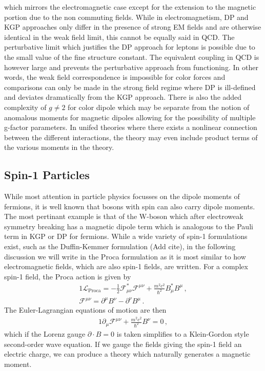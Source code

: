 which mirrors the electromagnetic case except for the extension to the magnetic portion due to the non commuting fields. While in electromagnetism, DP and KGP approaches only differ in the presence of strong EM fields and are otherwise identical in the weak field limit, this cannot be equally said in QCD. The perturbative limit which justifies the DP approach for leptons is possible due to the small value of the fine structure constant. The equivalent coupling in QCD is however large and prevents the perturbative approach from functioning. In other words, the weak field correspondence is impossible for color forces and comparisons can only be made in the strong field regime where DP is ill-defined and deviates dramatically from the KGP approach. There is also the added complexity of $g\neq2$ for color dipole which may be separate from the notion of anomalous moments for magnetic dipoles allowing for the possibility of multiple g-factor parameters. In unifed theories where there exists a nonlinear connection between the different interactions, the theory may even include product terms of the various moments in the theory.

\subsection{Spin-1 Particles}\label{ajss:proca}
While most attention in particle physics focusses on the dipole moments of fermions, it is well known that bosons with spin can also carry dipole moments. The most pertinant example is that of the W-boson which after electroweak symmetry breaking has a magnetic dipole term which is analogous to the Pauli term in KGP or DP for fermions. While a wide variety of spin-1 formulations exist, such as the Duffin-Kemmer formulation {\color{red}(Add cite)}, in the following discussion we will write in the Proca formulation as it is most similar to how electromagnetic fields, which are also spin-1 fields, are written. For a complex spin-1 field, the Proca action is given by
\begin{alignat}{1}
	\label{eq:proca:01a} \mathcal{L}_{\mathrm{Proca}} = -\frac{1}{2}\mathcal{F}_{\mu\nu}^{*}\mathcal{F}^{\mu\nu}+\frac{m^{2}c^{2}}{\hbar^{2}}B_{\mu}^{*}B^{\mu}\,,\\
	\label{eq:proca:01b} \mathcal{F}^{\mu\nu}=\partial^{\mu}B^{\nu}-\partial^{\nu}B^{\mu}\,.
\end{alignat}
The Euler-Lagrangian equations of motion are then
\begin{alignat}{1}
	\label{eq:proca:02a} \partial_{\mu}\mathcal{F}^{\mu\nu}+\frac{m^{2}c^{2}}{\hbar^{2}}B^{\nu}=0\,,
\end{alignat}
which if the Lorenz gauge $\partial\cdot B=0$ is taken simplifies to a Klein-Gordon style second-order wave equation. If we gauge the fields giving the spin-1 field an electric charge, we can produce a theory which naturally generates a magnetic moment.

